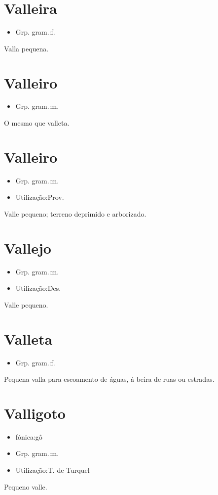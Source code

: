 \documentclass{article}
\begin{document}
\section{Valleira}
\begin{itemize}
\item {Grp. gram.:f.}
\end{itemize}
Valla pequena.
\section{Valleiro}
\begin{itemize}
\item {Grp. gram.:m.}
\end{itemize}
O mesmo que \textunderscore valleta\textunderscore .
\section{Valleiro}
\begin{itemize}
\item {Grp. gram.:m.}
\end{itemize}
\begin{itemize}
\item {Utilização:Prov.}
\end{itemize}
Valle pequeno; terreno deprimido e arborizado.
\section{Vallejo}
\begin{itemize}
\item {Grp. gram.:m.}
\end{itemize}
\begin{itemize}
\item {Utilização:Des.}
\end{itemize}
Valle pequeno.
\section{Valleta}
\begin{itemize}
\item {Grp. gram.:f.}
\end{itemize}
Pequena valla para escoamento de águas, á beira de ruas ou estradas.
\section{Valligoto}
\begin{itemize}
\item {fónica:gô}
\end{itemize}
\begin{itemize}
\item {Grp. gram.:m.}
\end{itemize}
\begin{itemize}
\item {Utilização:T. de Turquel}
\end{itemize}
Pequeno valle.
\end{document}
